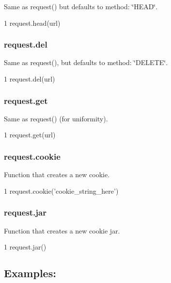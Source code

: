 Same as request() but defaults to {\ttfamily method\+: \char`\"{}\+H\+E\+A\+D\char`\"{}}.


\begin{DoxyCode}
1 request.head(url)
\end{DoxyCode}


\subsubsection*{request.\+del}

Same as {\ttfamily request()}, but defaults to {\ttfamily method\+: \char`\"{}\+D\+E\+L\+E\+T\+E\char`\"{}}.


\begin{DoxyCode}
1 request.del(url)
\end{DoxyCode}


\subsubsection*{request.\+get}

Same as {\ttfamily request()} (for uniformity).


\begin{DoxyCode}
1 request.get(url)
\end{DoxyCode}
 \subsubsection*{request.\+cookie}

Function that creates a new cookie.


\begin{DoxyCode}
1 request.cookie('cookie\_string\_here')
\end{DoxyCode}
 \subsubsection*{request.\+jar}

Function that creates a new cookie jar.


\begin{DoxyCode}
1 request.jar()
\end{DoxyCode}


\subsection*{Examples\+:}


